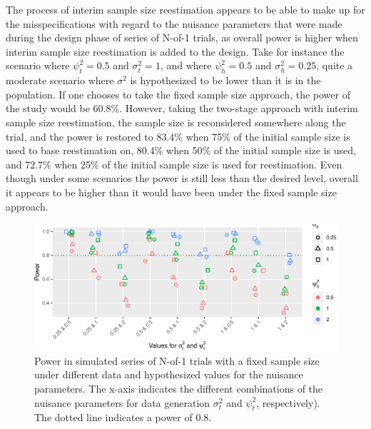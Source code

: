 \documentclass[AMA,STIX1COL,]{WileyNJD-v2}
\begin{document}
The process of interim sample size reestimation appears to be able to make up for the misspecifications with regard to the nuisance parameters that were made during the design phase of series of N-of-1 trials, as overall power is higher when interim sample size reestimation is added to the design. Take for instance the scenario where \(\psi_t^2 = 0.5\) and \(\sigma_t^2 = 1\), and where \(\psi_h^2 = 0.5\) and \(\sigma_h^2 = 0.25\), quite a moderate scenario where \(\sigma^2\) is hypothesized to be lower than it is in the population. If one chooses to take the fixed sample size approach, the power of the study would be 60.8\%. However, taking the two-stage approach with interim sample size reestimation, the sample size is reconsidered somewhere along the trial, and the power is restored to 83.4\% when 75\% of the initial sample size is used to base reestimation on, 80.4\% when 50\% of the initial sample size is used, and 72.7\% when 25\% of the initial sample size is used for reestimation. Even though under some scenarios the power is still less than the desired level, overall it appears to be higher than it would have been under the fixed sample size approach.

\begin{figure}

{\centering \includegraphics{Thesis_files/figure-latex/unnamed-chunk-2-1} 

}

\caption{Power in simulated series of N-of-1 trials with a fixed sample size under different data and hypothesized values for the nuisance parameters. The x-axis indicates the different combinations of the nuisance parameters for data generation $\sigma_t^2$ and $\psi_t^2$, respectively). The dotted line indicates a power of 0.8.\label{fig:fixedpower}}\label{fig:unnamed-chunk-2}
\end{figure}
\end{document}
